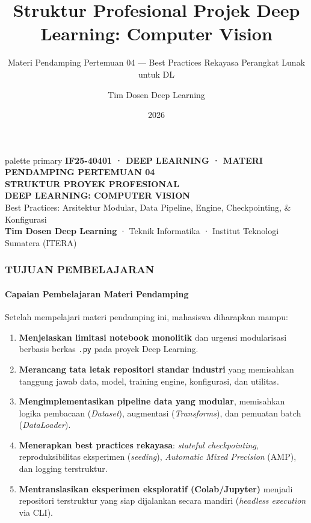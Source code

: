 \documentclass[t,aspectratio=169,xcolor=dvipsnames]{beamer}
\title[Struktur Projek CV]{Struktur Profesional Projek Deep Learning: Computer Vision}
\subtitle{Materi Pendamping Pertemuan 04 — Best Practices Rekayasa Perangkat Lunak untuk DL}
\author{Tim Dosen Deep Learning}
\institute{Teknik Informatika — Institut Teknologi Sumatera (ITERA)}
\date{2026}
\begin{document}
\begin{frame}[plain]
  \begin{beamercolorbox}[wd=\paperwidth,ht=0.96\paperheight,sep=0.8cm]{palette primary}
    \vspace{0.4cm}
    {\scriptsize\bfseries\color{dlMute}IF25-40401 · DEEP LEARNING · MATERI PENDAMPING PERTEMUAN 04}\\[0.35cm]
    {\Huge\bfseries STRUKTUR PROYEK PROFESIONAL\\DEEP LEARNING: COMPUTER VISION}\\[0.35cm]
    {\small Best Practices: Arsitektur Modular, Data Pipeline, Engine, Checkpointing, \& Konfigurasi}\\[0.8cm]
    \vfill
    {\scriptsize\textbf{Tim Dosen Deep Learning} · Teknik Informatika · Institut Teknologi Sumatera (ITERA)}
  \end{beamercolorbox}
\end{frame}

\begin{frame}
  \frametitle{TUJUAN PEMBELAJARAN}
  \framesubtitle{Capaian Pembelajaran Materi Pendamping}

  \begin{exampleblock}{Setelah mempelajari materi pendamping ini, mahasiswa diharapkan mampu:}
    \small
    \begin{enumerate}\setlength{\itemsep}{2pt}
      \item \textbf{Menjelaskan limitasi notebook monolitik} dan urgensi modularisasi berbasis berkas \texttt{.py} pada proyek Deep Learning.
      \item \textbf{Merancang tata letak repositori standar industri} yang memisahkan tanggung jawab data, model, training engine, konfigurasi, dan utilitas.
      \item \textbf{Mengimplementasikan pipeline data yang modular}, memisahkan logika pembacaan (\textit{Dataset}), augmentasi (\textit{Transforms}), dan pemuatan batch (\textit{DataLoader}).
      \item \textbf{Menerapkan best practices rekayasa}: \textit{stateful checkpointing}, reproduksibilitas eksperimen (\textit{seeding}), \textit{Automatic Mixed Precision} (AMP), dan logging terstruktur.
      \item \textbf{Mentranslasikan eksperimen eksploratif (Colab/Jupyter)} menjadi repositori terstruktur yang siap dijalankan secara mandiri (\textit{headless execution} via CLI).
    \end{enumerate}
  \end{exampleblock}
\end{frame}
\end{document}
